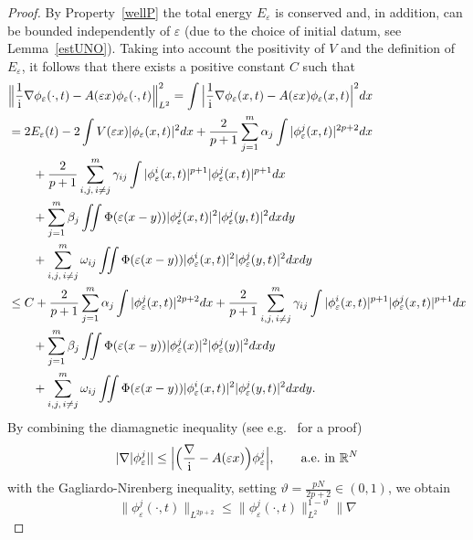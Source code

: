 \documentclass[11pt]{amsart}
\numberwithin{equation}{section}
\theoremstyle{definition}
\begin{document}
\begin{proof}
By Property~\ref{wellP} the total energy $E_{\varepsilon}$ is conserved
and, in addition, can be bounded independently of ${\varepsilon}$ (due to
the choice of initial datum, see Lemma~\ref{estUNO}). Taking into
account the positivity of $V$ and the definition of $E_{\varepsilon}$, it
follows that there exists a positive constant $C$ such that
\begin{equation}\label{norma22}
\begin{aligned}
& \Big\|\frac{1}{{\rm i}}\nabla\phi_{\varepsilon}(\cdot,t)-A({\varepsilon}
x)\phi_{\varepsilon}(\cdot,t)\Big\|^{2}_{L^2}  =\int \Big|
\frac{1}{{\rm i}}\nabla\phi_{\varepsilon}(x,t)-A({\varepsilon}
x)\phi_{\varepsilon}(x,t)\Big|^2 dx\\
& = 2E_{\varepsilon}(t)-2\int V({\varepsilon} x)|\phi_{\varepsilon}(x,t)|^{2}dx
+\frac{2}{p+1}\sum_{j=1}^m\alpha_j\int |\phi^j_{\varepsilon}(x,t)|^{2p+2}dx \\
& \qquad +\frac{2}{p+1}\sum_{i,j,\,i\neq j}^m \gamma_{ij}\int |\phi^i_{\varepsilon}(x,t)|^{p+1}|\phi^j_{\varepsilon}(x,t)|^{p+1}dx \\
& \qquad +\sum_{j=1}^m\beta_j \iint \Phi({\varepsilon}(x-y))|\phi^j_{\varepsilon}(x,t)|^2|\phi^j_{\varepsilon}(y,t)|^2 dx dy \\
& \qquad +\sum_{i,j,\,i\neq j}^m\omega_{ij} \iint \Phi({\varepsilon}(x-y))|\phi^i_{\varepsilon}(x,t)|^2|\phi^j_{\varepsilon}(y,t)|^2 dx dy \\
& \leq C+\frac{2}{p+1}\sum_{j=1}^m\alpha_j\int
|\phi_{\varepsilon}^j(x,t)|^{2p+2}dx
 +\frac{2}{p+1}\sum_{i,j,\,i\neq j}^m \gamma_{ij}\int |\phi_{\varepsilon}^i(x,t)|^{p+1}|\phi_{\varepsilon}^j(x,t)|^{p+1}dx \\
& \qquad +\sum_{j=1}^m\beta_j \iint \Phi({\varepsilon}(x-y))|\phi_{\varepsilon}^j(x)|^2|\phi_{\varepsilon}^j(y)|^2 dx dy \\
& \qquad +\sum_{i,j,\,i\neq j}^m\omega_{ij} \iint
\Phi({\varepsilon}(x-y))|\phi_{\varepsilon}^i(x,t)|^2|\phi_{\varepsilon}^j(y,t)|^2 dx dy.
\end{aligned}
\end{equation}
By combining the diamagnetic inequality (see e.g.~\cite{EL} for a proof)
$$
|\nabla |\phi_{\varepsilon}^j||\leq \Big|\Big(\frac{\nabla}{{\rm i}}-A({\varepsilon}
x)\Big)\phi_{\varepsilon}^j\Big|,\qquad \text{a.e.\ in ${{\mathbb R}}^N$}
$$
with the Gagliardo-Nirenberg inequality, setting
$\vartheta=\frac{pN}{2p+2}\in (0,1)$, we obtain
$$
\|\phi_{\varepsilon}^j(\cdot,t)\|_{L^{2p+2}}\leq
\|\phi_{\varepsilon}^j(\cdot,t)\|_{L^{2}}^{1-\vartheta} \|\nabla
$$
\end{proof}
\end{document}
